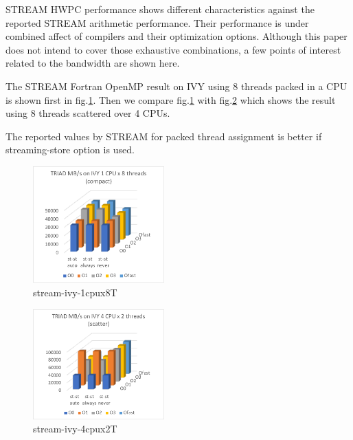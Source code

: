 \documentclass[conference]{IEEEtran}
\begin{document}
STREAM HWPC performance shows different characteristics against
the reported STREAM arithmetic performance. Their performance is under
combined affect of compilers and their optimization options.
Although this paper does not intend to cover those exhaustive combinations,
a few points of interest related to the bandwidth are shown here.

The STREAM Fortran OpenMP result on IVY using 8 threads packed in a CPU
is shown first in fig.\ref{fig:stream-ivy-1cpux8T}.
Then we compare fig.\ref{fig:stream-ivy-1cpux8T}
with
fig.\ref{fig:stream-ivy-4cpux2T} 
which shows the result using 8 threads scattered over 4 CPUs.

The reported values by STREAM for packed thread assignment is better
if streaming-store option is used.
%
%
\begin{figure}[tb]
\centering
\includegraphics[width=0.45\textwidth]{figs/stream-ivy-1cpux8T.pdf}
\caption{stream-ivy-1cpux8T}
\label{fig:stream-ivy-1cpux8T}
\end{figure}
\begin{figure}[tb]
\centering
\includegraphics[width=0.45\textwidth]{figs/stream-ivy-4cpux2T.pdf}
\caption{stream-ivy-4cpux2T}
\label{fig:stream-ivy-4cpux2T}
\end{figure}
%
\end{document}
